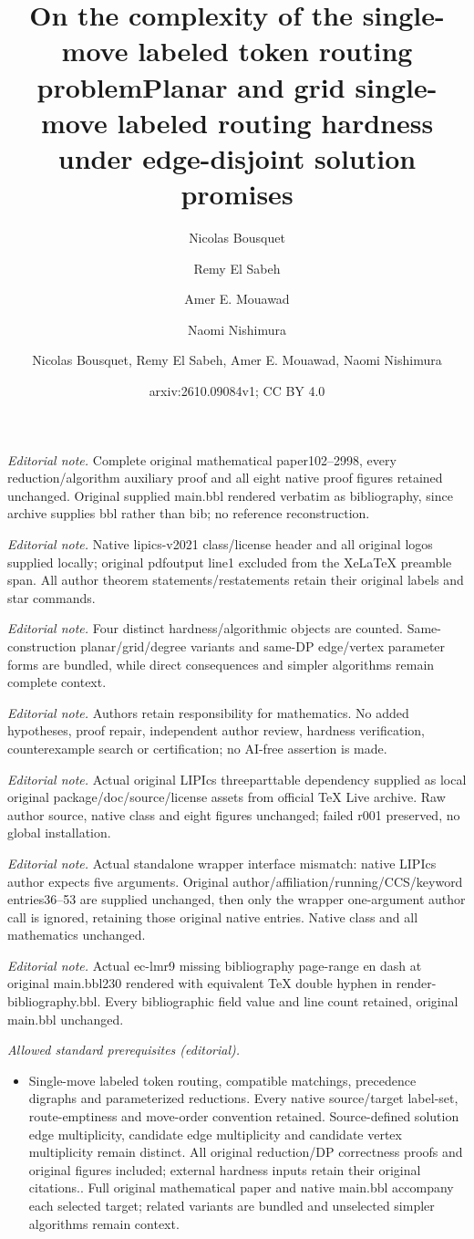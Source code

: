 \documentclass[a4paper,USenglish,thm-restate]{lipics-v2021}
\title{On the complexity of the single-move labeled token routing problem}
\author{Nicolas Bousquet}{CNRS, Univ.\ Lyon, Universit\'e Lyon 1, INSA Lyon, LIRIS UMR CNRS 5205, F-69621 Villeurbanne, France}{nicolas.bousquet@cnrs.fr}{https://orcid.org/0000-0003-0170-0503}{}
\author{Remy {El Sabeh}}{David R. Cheriton School of Computer Science, University of Waterloo, Waterloo, ON, Canada}{relsabeh@uwaterloo.ca}{https://orcid.org/0000-0002-3786-4035}{}
\author{Amer E. Mouawad}{American University of Beirut, Beirut, Lebanon \and David R. Cheriton School of Computer Science, University of Waterloo, Waterloo, ON, Canada}{aa368@aub.edu.lb}{}{}
\author{Naomi Nishimura}{David R. Cheriton School of Computer Science, University of Waterloo, Waterloo, ON, Canada}{nishi@uwaterloo.ca}{}{}
\title{Planar and grid single-move labeled routing hardness under edge-disjoint solution promises}
\author{Nicolas Bousquet, Remy El Sabeh, Amer E. Mouawad, Naomi Nishimura}
\date{arxiv:2610.09084v1; CC BY 4.0}
\theoremstyle{problemstyle}
\begin{document}
\maketitle
\noindent\textit{Editorial note.} Complete original mathematical paper102--2998, every reduction/algorithm auxiliary proof and all eight native proof figures retained unchanged. Original supplied main.bbl rendered verbatim as bibliography, since archive supplies bbl rather than bib; no reference reconstruction.\par\medskip
\noindent\textit{Editorial note.} Native lipics-v2021 class/license header and all original logos supplied locally; original pdfoutput line1 excluded from the XeLaTeX preamble span. All author theorem statements/restatements retain their original labels and star commands.\par\medskip
\noindent\textit{Editorial note.} Four distinct hardness/algorithmic objects are counted. Same-construction planar/grid/degree variants and same-DP edge/vertex parameter forms are bundled, while direct consequences and simpler algorithms remain complete context.\par\medskip
\noindent\textit{Editorial note.} Authors retain responsibility for mathematics. No added hypotheses, proof repair, independent author review, hardness verification, counterexample search or certification; no AI-free assertion is made.\par\medskip
\noindent\textit{Editorial note.} Actual original LIPIcs threeparttable dependency supplied as local original package/doc/source/license assets from official TeX Live archive. Raw author source, native class and eight figures unchanged; failed r001 preserved, no global installation.\par\medskip
\noindent\textit{Editorial note.} Actual standalone wrapper interface mismatch: native LIPIcs author expects five arguments. Original author/affiliation/running/CCS/keyword entries36--53 are supplied unchanged, then only the wrapper one-argument author call is ignored, retaining those original native entries. Native class and all mathematics unchanged.\par\medskip
\noindent\textit{Editorial note.} Actual ec-lmr9 missing bibliography page-range en dash at original main.bbl230 rendered with equivalent TeX double hyphen in render-bibliography.bbl. Every bibliographic field value and line count retained, original main.bbl unchanged.\par\medskip
\noindent\textit{Allowed standard prerequisites (editorial).}\begin{itemize}
\item Single-move labeled token routing, compatible matchings, precedence digraphs and parameterized reductions. Every native source/target label-set, route-emptiness and move-order convention retained. Source-defined solution edge multiplicity, candidate edge multiplicity and candidate vertex multiplicity remain distinct. All original reduction/DP correctness proofs and original figures included; external hardness inputs retain their original citations.. Full original mathematical paper and native main.bbl accompany each selected target; related variants are bundled and unselected simpler algorithms remain context.
\end{itemize}\medskip
\end{document}
